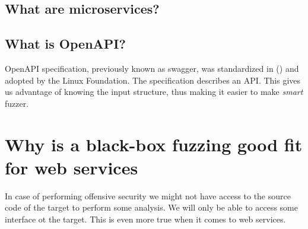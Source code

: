\subsection{What are microservices?}

\subsection{What is OpenAPI?}
OpenAPI specification, previously known as swagger, was standardized in () and adopted by the Linux Foundation. The specification describes an API. This gives us advantage of knowing the input structure, thus making it easier to make \emph{smart} fuzzer.

\section{Why is a black-box fuzzing good fit for web services}
In case of performing offensive security we might not have access to the source code of the target to perform some analysis. We will only be able to access some interface ot the target. This is even more true when it comes to web services.
